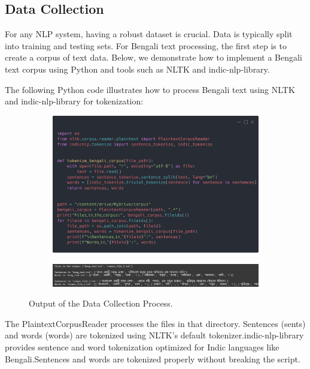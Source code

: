 \subsection{Data Collection} 

For any NLP system, having a robust dataset is crucial. Data is typically split into training and testing sets. For Bengali text processing, the first step is to create a corpus of text data. Below, we demonstrate how to implement a Bengali text corpus using Python and tools such as NLTK and indic-nlp-library.

The following Python code illustrates how to process Bengali text using NLTK and indic-nlp-library for tokenization:

\begin{figure}[H]
    \centering
    \begin{subfigure}{0.6\linewidth}
        \includegraphics[width=\linewidth]{Attachments/Figures/data-collection-for-nlp_figure1.png}
    \end{subfigure}
    \begin{subfigure}{0.6\linewidth}
        \includegraphics[width=\linewidth]{Attachments/Figures/data-collection-for-nlp_figure2.png}
    \end{subfigure}
    \caption{Output of the Data Collection Process.}
\end{figure}

The PlaintextCorpusReader processes the files in that directory. Sentences (sents) and words (words) are tokenized using NLTK’s default tokenizer.indic-nlp-library provides sentence and word tokenization optimized for Indic languages like Bengali.Sentences and words are tokenized properly without breaking the script.